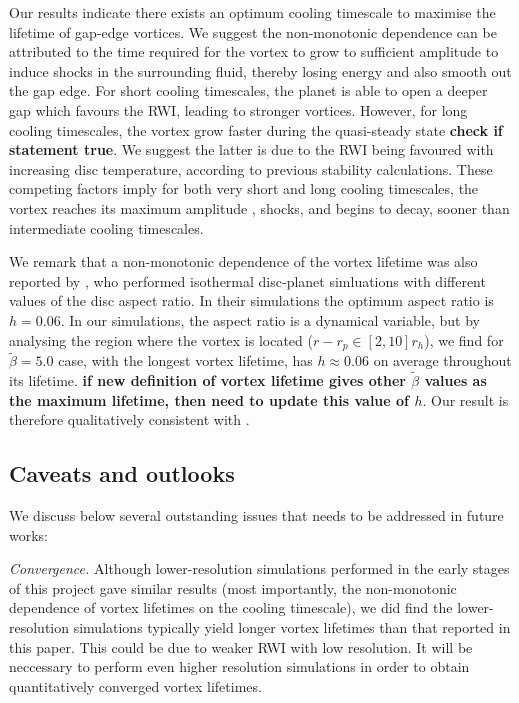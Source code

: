 Our results indicate there exists an optimum cooling timescale to maximise the lifetime of gap-edge vortices. We suggest the non-monotonic dependence
can be attributed to the time required for the vortex to grow to sufficient amplitude to induce shocks in the surrounding fluid, thereby losing energy and also smooth out the gap edge.  
For short cooling timescales, the planet is able to open a deeper gap which favours the RWI, leading to stronger vortices. However, for long 
cooling timescales, the vortex grow faster during the quasi-steady state {\bf check if statement true}. 
We suggest the latter is due to the RWI being favoured with increasing disc temperature, according to previous stability
calculations. These competing factors imply for both very short and long cooling timescales, the vortex reaches its maximum amplitude 
, shocks, and begins to decay, sooner than intermediate cooling timescales. 

We remark that a non-monotonic dependence of the vortex lifetime was also reported
by \cite{fu14}, who performed isothermal disc-planet simluations with different values of the 
disc aspect ratio. In their simulations the optimum aspect ratio is $h=0.06$. In our simulations,
the aspect ratio is a dynamical variable, but by analysing the region where the vortex is located ($r-r_p\in[2,10]r_h$), 
we find for $\tilde\beta=5.0$ case, with the longest vortex lifetime, has
$h\approx0.06$ on average throughout its lifetime. 
{\bf if new definition of vortex lifetime gives other $\tilde{\beta}$ values as the maximum lifetime, then need to update this value of $h$}. 
Our result is therefore qualitatively consistent with \citep{fu14}. 

\subsection{Caveats and outlooks}
We discuss below several outstanding issues that needs to be addressed in future works:

\emph{Convergence.} Although lower-resolution simulations performed in the early stages of this project gave similar results 
(most importantly, the non-monotonic dependence of vortex lifetimes on the cooling timescale), we did find the lower-resolution simulations 
typically yield longer vortex lifetimes than that reported in this paper. This could be due to weaker RWI with low resolution. 
It will be neccessary to perform even higher resolution  simulations in order to obtain quantitatively converged vortex lifetimes. 
 
